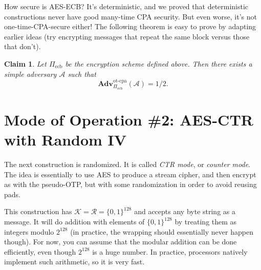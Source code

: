 \documentclass[11pt]{article}
\newtheorem{claim}{Claim}
\newcommand{\keys}{\mathcal{K}}
\newcommand{\rands}{\mathcal{R}}
\newcommand{\calA}{\mathcal{A}}
\newcommand{\Adv}{\mathbf{Adv}}
\newcommand{\bits}{\{0,1\}}
\newcommand{\AdvOTCPA}[2]{\Adv^{\mathrm{ot\mbox{-}cpa}}_{#1}({#2})}
\begin{document}
How secure is AES-ECB? It's deterministic, and we proved that deterministic
constructions never have good many-time CPA security. But even worse, it's
not one-time-CPA-secure either! The following theorem is easy to prove
by adapting earlier ideas (try encrypting messages that repeat the same
block versus those that don't).

\begin{claim}
    Let $\Pi_{\mathrm{ecb}}$ be the encryption scheme defined above.
    Then there exists a simple adversary $\calA$ such that
    \[
        \AdvOTCPA{\Pi_{\mathrm{ecb}}}{\calA} = 1/2.
    \]
\end{claim}

\section{Mode of Operation \#2: AES-CTR with Random IV}

The next construction is randomized. It is called \emph{CTR mode}, or
\emph{counter mode}.  The idea is essentially to use AES to produce
a stream cipher, and then encrypt as with the pseudo-OTP, but with
some randomization in order to avoid reusing pads.

This construction has $\keys=\rands=\bits^{128}$ and accepts any byte string as
a message. It will do addition with elements of $\bits^{128}$ by treating them
as integers modulo $2^{128}$ (in practice, the wrapping should essentially
never happen though).  For now, you can assume that the modular addition can be
done efficiently, even though $2^{128}$ is a huge number. In practice,
processors natively implement such arithmetic, so it is very fast.
\end{document}
